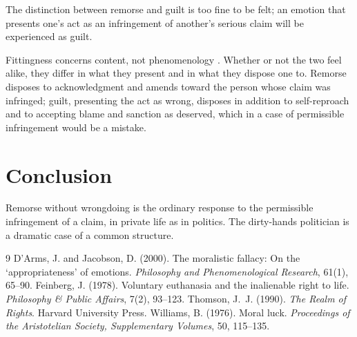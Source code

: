 \documentclass{situationist-preprint}
\begin{document}
\begin{objection}
The distinction between remorse and guilt is too fine to be felt; an emotion that presents one's act as an infringement of another's serious claim will be experienced as guilt.
\end{objection}

\begin{reply}
Fittingness concerns content, not phenomenology \citep{DArmsJacobson2000}. Whether or not the two feel alike, they differ in what they present and in what they dispose one to. Remorse disposes to acknowledgment and amends toward the person whose claim was infringed; guilt, presenting the act as wrong, disposes in addition to self-reproach and to accepting blame and sanction as deserved, which in a case of permissible infringement would be a mistake.
\end{reply}

\section{Conclusion}

Remorse without wrongdoing is the ordinary response to the permissible infringement of a claim, in private life as in politics. The dirty-hands politician is a dramatic case of a common structure.

\begin{thebibliography}{9}\small
{} D'Arms, J. and Jacobson, D. (2000). The moralistic fallacy: On the `appropriateness' of emotions. \emph{Philosophy and Phenomenological Research}, 61(1), 65--90.
 Feinberg, J. (1978). Voluntary euthanasia and the inalienable right to life. \emph{Philosophy \& Public Affairs}, 7(2), 93--123.
 Thomson, J.~J. (1990). \emph{The Realm of Rights}. Harvard University Press.
 Williams, B. (1976). Moral luck. \emph{Proceedings of the Aristotelian Society, Supplementary Volumes}, 50, 115--135.
\end{thebibliography}
\end{document}
